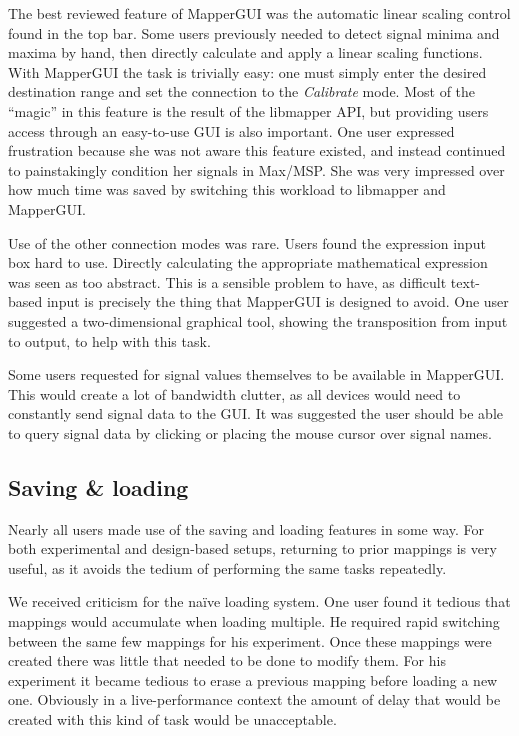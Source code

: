 The best reviewed feature of MapperGUI was the automatic linear scaling control found in the top bar. Some users previously needed to detect signal minima and maxima by hand, then directly calculate and apply a linear scaling functions. With MapperGUI the task is trivially easy: one must simply enter the desired destination range and set the connection to the \emph{Calibrate} mode. Most of the ``magic'' in this feature is the result of the libmapper API, but providing users access through an easy-to-use GUI is also important. One user expressed frustration because she was not aware this feature existed, and instead continued to painstakingly condition her signals in Max/MSP. She was very impressed over how much time was saved by switching this workload to libmapper and MapperGUI.

Use of the other connection modes was rare. Users found the expression input box hard to use. Directly calculating the appropriate mathematical expression was seen as too abstract. This is a sensible problem to have, as difficult text-based input is precisely the thing that MapperGUI is designed to avoid. One user suggested a two-dimensional graphical tool, showing the transposition from input to output, to help with this task. 

Some users requested for signal values themselves to be available in MapperGUI. This would create a lot of bandwidth clutter, as all devices would need to constantly send signal data to the GUI. It was suggested the user should be able to query signal data by clicking or placing the mouse cursor over signal names.
	

	\subsection{Saving \& loading} %
	\label{sub:saving_and_loading}

Nearly all users made use of the saving and loading features in some way. For both experimental and design-based setups, returning to prior mappings is very useful, as it avoids the tedium of performing the same tasks repeatedly.

We received criticism for the na\"ive loading system. One user found it tedious that mappings would accumulate when loading multiple. He required rapid switching between the same few mappings for his experiment. Once these mappings were created there was little that needed to be done to modify them. For his experiment it became tedious to erase a previous mapping before loading a new one. Obviously in a live-performance context the amount of delay that would be created with this kind of task would be unacceptable. 

